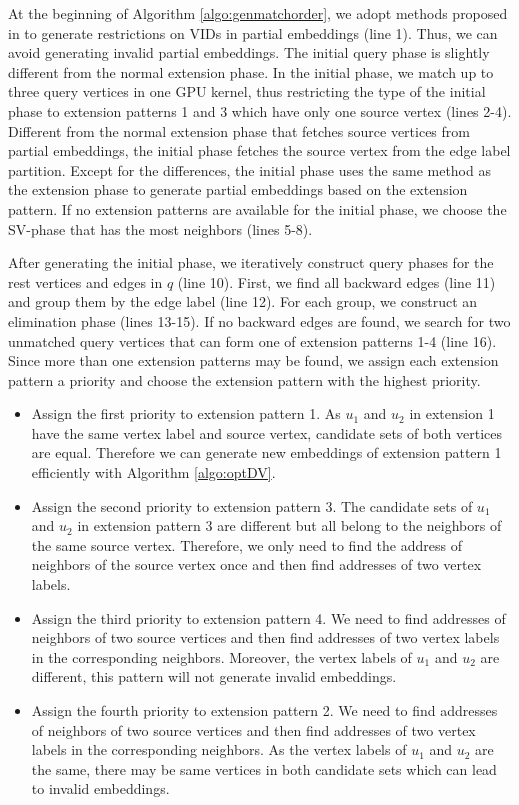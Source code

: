 At the beginning of Algorithm \ref{algo:genmatchorder}, we adopt methods proposed in \cite{shi2020graphpi,mawhirter2019graphzero} to generate restrictions on VIDs in partial embeddings (line 1). Thus, we can avoid generating invalid partial embeddings. The initial query phase is slightly different from the normal extension phase. In the initial phase, we match up to three query vertices in one GPU kernel, thus restricting the type of the initial phase to extension patterns 1 and 3 which have only one source vertex (lines 2-4). Different from the normal extension phase that fetches source vertices from partial embeddings, the initial phase fetches the source vertex from the edge label partition. Except for the differences, the initial phase uses the same method as the extension phase to generate partial embeddings based on the extension pattern. If no extension patterns are available for the initial phase, we choose the SV-phase that has the most neighbors (lines 5-8).

After generating the initial phase, we iteratively construct query phases for the rest vertices and edges in $q$ (line 10). First, we find all backward edges (line 11) and group them by the edge label (line 12). For each group, we construct an elimination phase (lines 13-15). If no backward edges are found, we search for two unmatched query vertices that can form one of extension patterns 1-4 (line 16). Since more than one extension patterns may be found, we assign each extension pattern a priority and choose the extension pattern with the highest priority.
\begin{itemize}
  \item Assign the first priority to extension pattern 1. As $u_1$ and $u_2$ in extension 1 have the same vertex label and source vertex, candidate sets of both vertices are equal. Therefore we can generate new embeddings of extension pattern 1 efficiently with Algorithm \ref{algo:optDV}.
  \item Assign the second priority to extension pattern 3. The candidate sets of $u_1$ and $u_2$ in extension pattern 3 are different but all belong to the neighbors of the same source vertex. Therefore, we only need to find the address of neighbors of the source vertex once and then find addresses of two vertex labels.
  \item Assign the third priority to extension pattern 4. We need to find addresses of neighbors of two source vertices and then find addresses of two vertex labels in the corresponding neighbors. Moreover, the vertex labels of $u_1$ and $u_2$ are different, this pattern will not generate invalid embeddings.
  \item Assign the fourth priority to extension pattern 2. We need to find addresses of neighbors of two source vertices and then find addresses of two vertex labels in the corresponding neighbors. As the vertex labels of $u_1$ and $u_2$ are the same, there may be same vertices in both candidate sets which can lead to invalid embeddings.
\end{itemize}

